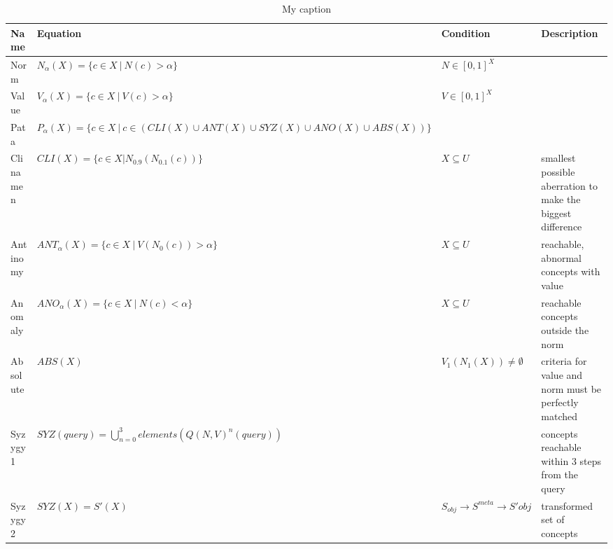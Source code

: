 \documentclass[11pt]{thesis} %
\begin{document}
\begin{table}[]
\centering
\caption{My caption}
\label{my-label}
\begin{tabu}{X[0.8]X[3]XX[2]}
\toprule
\textbf{Name}&\textbf{Equation}&\textbf{Condition}&\textbf{Description} \\
\midrule
Norm & $N_\alpha (X) = \{c \in X \ | \ N(c)> \alpha\}$ & $N \in [0,1]^X$ & \\
Value & $V_\alpha(X) = \{c \in X \ | \ V(c) > \alpha\}$ & $V \in [0,1]^X$ & \\
Pata & $P_\alpha(X) = \{c \in X \ | \ c \in(CLI(X)\cup ANT(X) \cup SYZ(X) \cup ANO(X) \cup ABS(X))\}$ & & \\
Clinamen & $CLI(X) = \{c \in X | N_{0.9} (N_{0.1} (c))\}$ & $X \subseteq U$ & smallest possible aberration to make the biggest difference \\
Antinomy & $ANT_\alpha(X) = \{c \in X \ | \ V(N_0(c)) > \alpha\}$ & $X \subseteq U$ & reachable, abnormal concepts with value \\
Anomaly & $ANO_\alpha(X) = \{c \in X \ | \ N(c)< \alpha\}$ & $X \subseteq U$ & reachable concepts outside the norm \\
Absolute & $ABS(X)$ & $V_1 (N_1 (X)) \neq \emptyset$ & criteria for value and norm must be perfectly matched \\
Syzygy 1 & $SYZ(query) = \bigcup_{n=0}^{3} elements(Q(N,V)^n (query))$ & & concepts reachable within 3 steps from the query \\
Syzygy 2 & $SYZ(X) = S'(X)$ & $S_{obj} \rightarrow S^{meta} \rightarrow S'{obj}$ & transformed set of concepts \\
\bottomrule
\end{tabu}
\end{table}
\end{document}
